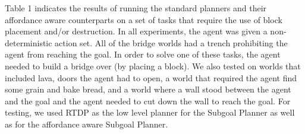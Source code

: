 \documentclass[]{article}
\begin{document}

%
%



Table 1 indicates the results of running the standard planners and their affordance
aware counterparts on a set of tasks that require the use of block placement and/or
destruction. In all experiments, the agent was given a non-deterministic action set.
All of the bridge worlds had a trench prohibiting the agent from reaching the goal. In order
to solve one of these tasks, the agent needed to build a bridge over (by placing a block). We also
tested on worlds that included lava, doors the agent had to open, a world that required the agent find some grain and bake bread, and a 
world where a wall stood between the agent and the goal and the agent needed to cut down the wall
to reach the goal. For testing, we used RTDP as the low level planner for the Subgoal Planner
as well as for the affordance aware Subgoal Planner.
\end{document}
